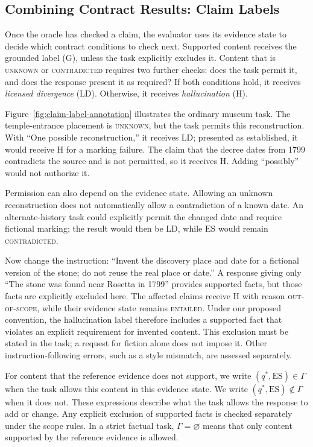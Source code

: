 \documentclass{clv2025}
\newcommand{\LD}{\textsc{LD}}
\newcommand{\Hall}{\textsc{H}}
\newcommand{\Grd}{\textsc{G}}
\begin{document}
\subsection{Combining Contract Results: Claim Labels}\label{subsec:rule}

Once the oracle has checked a claim, the evaluator uses its evidence state
to decide which contract conditions to check next. Supported content receives
the grounded label (\Grd), unless the task explicitly excludes it. Content
that is \textsc{unknown} or \textsc{contradicted} requires two further checks:
does the task permit it, and does the response present it as required?
If both conditions hold, it receives \emph{licensed divergence} (\LD).
Otherwise, it receives \emph{hallucination} (\Hall).

Figure~\ref{fig:claim-label-annotation} illustrates the ordinary museum task.
The temple-entrance placement is \textsc{unknown}, but the task permits this
reconstruction. With ``One possible reconstruction,'' it receives \LD{};
presented as established, it would receive \Hall{} for a marking failure.
The claim that the decree dates from 1799 contradicts the source and is not
permitted, so it receives \Hall{}. Adding ``possibly'' would not authorize it.

Permission can also depend on the evidence state. Allowing an unknown
reconstruction does not automatically allow a contradiction of a known date.
An alternate-history task could explicitly permit the changed date and
require fictional marking; the result would then be \LD{}, while $\mathrm{ES}$ would
remain \textsc{contradicted}.

Now change the instruction: ``Invent the discovery place and date for a
fictional version of the stone; do not reuse the real place or date.'' A
response giving only ``The stone was found near Rosetta in 1799'' provides
supported facts, but those facts are explicitly excluded here. The affected
claims receive \Hall{} with reason \textsc{out-of-scope}, while their evidence
state remains \textsc{entailed}. Under our proposed convention, the
hallucination label therefore includes a supported fact that violates an
explicit requirement for invented content. This exclusion must be stated
in the task; a request for fiction alone does not impose it. Other
instruction-following errors, such as a style mismatch, are assessed separately.

For content that the reference evidence does not support, we write
$(q^*,\mathrm{ES})\in\Gamma$ when the task allows this content in this evidence state.
We write $(q^*,\mathrm{ES})\notin\Gamma$ when it does not. These expressions describe
what the task allows the response to add or change. Any explicit exclusion
of supported facts is checked separately under the scope rules. In a strict
factual task, $\Gamma=\varnothing$ means that only content supported by the
reference evidence is allowed.
\end{document}
